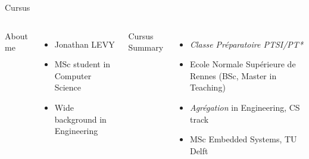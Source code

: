 
\begin{frame}{Cursus}
	\begin{columns}
		\begin{center}
			About me
		\end{center}
			\begin{itemize}
				\item Jonathan LEVY
				\item MSc student in Computer Science
				\item Wide background in Engineering
			\end{itemize}
		\begin{center}
			Cursus Summary
		\end{center}
		\begin{itemize}
			\item \emph{Classe Préparatoire PTSI/PT*}
			\item Ecole Normale Supérieure de Rennes (BSc, Master in Teaching)
			\item \emph{Agrégation} in Engineering, CS track
			\item MSc Embedded Systems, TU Delft
		\end{itemize}
	\end{columns}
\end{frame}